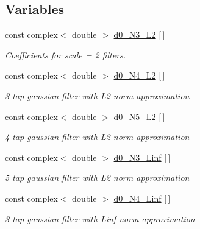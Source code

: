 \subsection*{Variables}
\begin{DoxyCompactItemize}
\item 
\mbox{\label{IIRGausDeriv_8h_af5e16ead99087cccae6b8aa7a89a0952}} 
const complex$<$ double $>$ \hyperlink{IIRGausDeriv_8h_af5e16ead99087cccae6b8aa7a89a0952}{d0\+\_\+\+N3\+\_\+\+L2} \mbox{[}$\,$\mbox{]}
\begin{DoxyCompactList}\small\item\em Coefficients for scale = 2 filters. \end{DoxyCompactList}\item 
\mbox{\label{IIRGausDeriv_8h_a2a1aeabf73a18a2c89f07ff0f43295c8}} 
const complex$<$ double $>$ \hyperlink{IIRGausDeriv_8h_a2a1aeabf73a18a2c89f07ff0f43295c8}{d0\+\_\+\+N4\+\_\+\+L2} \mbox{[}$\,$\mbox{]}
\begin{DoxyCompactList}\small\item\em 3 tap gaussian filter with L2 norm approximation \end{DoxyCompactList}\item 
\mbox{\label{IIRGausDeriv_8h_a77152b0c665b268cefdf513125e929e3}} 
const complex$<$ double $>$ \hyperlink{IIRGausDeriv_8h_a77152b0c665b268cefdf513125e929e3}{d0\+\_\+\+N5\+\_\+\+L2} \mbox{[}$\,$\mbox{]}
\begin{DoxyCompactList}\small\item\em 4 tap gaussian filter with L2 norm approximation \end{DoxyCompactList}\item 
\mbox{\label{IIRGausDeriv_8h_a8c8a923a255f7d1433ccbb5ca69e6848}} 
const complex$<$ double $>$ \hyperlink{IIRGausDeriv_8h_a8c8a923a255f7d1433ccbb5ca69e6848}{d0\+\_\+\+N3\+\_\+\+Linf} \mbox{[}$\,$\mbox{]}
\begin{DoxyCompactList}\small\item\em 5 tap gaussian filter with L2 norm approximation \end{DoxyCompactList}\item 
\mbox{\label{IIRGausDeriv_8h_a5d56d85deaa8b0093b9a25f6dd2e390c}} 
const complex$<$ double $>$ \hyperlink{IIRGausDeriv_8h_a5d56d85deaa8b0093b9a25f6dd2e390c}{d0\+\_\+\+N4\+\_\+\+Linf} \mbox{[}$\,$\mbox{]}
\begin{DoxyCompactList}\small\item\em 3 tap gaussian filter with Linf norm approximation \end{DoxyCompactList}\item 

\end{DoxyCompactItemize}
